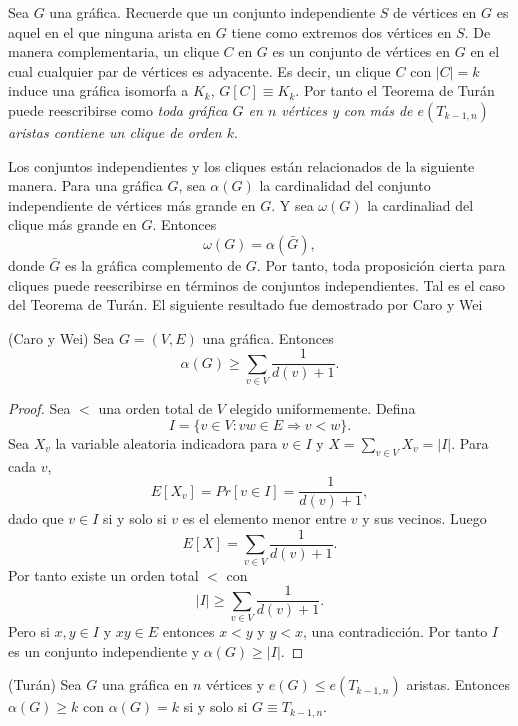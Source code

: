 Sea $G$ una gráfica. Recuerde que un conjunto independiente $S$ de
vértices en $G$ es aquel en el que ninguna arista en $G$ tiene como
extremos dos vértices en $S$. De manera complementaria, un clique $C$
en $G$ es un conjunto de vértices en $G$ en el cual cualquier par de
vértices es adyacente. Es decir, un clique $C$ con $\vert C \vert =
k$ induce una gráfica isomorfa a $K_k$, $G[C] \equiv K_k$. Por tanto
el Teorema de Turán puede reescribirse como \textit{toda gráfica $G$
  en $n$ vértices y con más de $e(T_{k-1, n})$ aristas contiene un
clique de orden $k$}.

Los conjuntos independientes y los cliques están relacionados de la siguiente
manera. Para una gráfica $G$, sea $\alpha(G)$ la cardinalidad del conjunto
independiente de vértices más grande en $G$. Y sea $\omega(G)$ la
cardinaliad del
clique más grande en $G$. Entonces
$$\omega(G) = \alpha(\bar{G}),$$
donde $\bar{G}$ es la gráfica complemento de $G$. Por tanto, toda
proposición cierta para cliques puede reescribirse en términos de
conjuntos independientes. Tal es el caso del Teorema de Turán. El
siguiente resultado fue demostrado por
Caro \cite{caro1979} y Wei  %

\begin{theorem} (Caro y Wei)
  Sea $G = (V, E)$ una gráfica. Entonces $$ \alpha(G) \geq \sum_{v
  \in V} \frac{1}{d(v) + 1}.$$
\end{theorem}

\begin{proof}
  Sea $<$ una orden total de $V$ elegido uniformemente. Defina
  $$I = \{v \in V: vw \in E \Rightarrow v < w \}.$$
  Sea $X_{v}$ la variable aleatoria indicadora para $v \in I$ y $X =
  \sum_{v \in V} X_v = \vert I \vert$. Para cada $v$,
  $$E[X_v] = Pr[v \in I] = \frac{1}{d(v) + 1},$$
  dado que $v \in I$ si y solo si $v$ es el elemento menor entre $v$
  y sus vecinos. Luego
  $$ E[X] = \sum_{v \in V} \frac{1}{d(v) + 1}. $$
  Por tanto existe un orden total $<$ con
  $$\vert I \vert \ge \sum_{v \in V} \frac{1}{d(v)  +1 }.$$
  Pero si $x, y \in I$ y $xy \in E$ entonces $x < y$ y $y < x$, una
  contradicción. Por tanto $I$ es un conjunto independiente y
  $\alpha(G) \ge \vert I \vert.$
\end{proof}

\begin{theorem} (Turán)
  Sea $G$ una gráfica en $n$ vértices y $e(G) \le e(T_{k-1, n})$
  aristas. Entonces $\alpha(G) \geq k$ con $\alpha(G) = k$ si y solo
  si $G \equiv T_{k-1, n}$.
\end{theorem}

